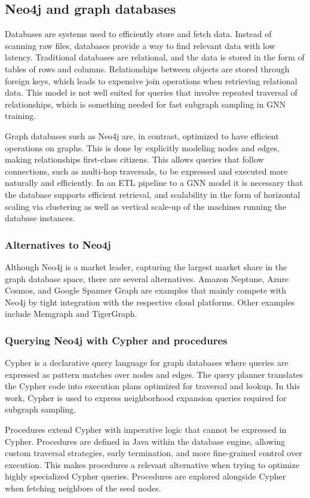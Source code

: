 \documentclass[PhD]{uclathes}
\begin{document}
\subsection{Neo4j and graph databases}
Databases are systems used to efficiently store and fetch data. Instead of
scanning raw files, databases provide a way to find relevant data with low
latency. Traditional databases are relational, and the data is stored in the
form of tables of rows and columns. Relationships between objects are stored
through foreign keys, which leads to expensive join operations when retrieving
relational data. This model is not well suited for queries that involve
repeated traversal of relationships, which is something needed for fast
subgraph sampling in GNN training.

Graph databases such as Neo4j are, in contrast, optimized to have efficient
operations on graphs. This is done by explicitly modeling nodes and edges,
making relationships first-class citizens. This allows queries that follow
connections, such as multi-hop traversals, to be expressed and executed more
naturally and efficiently. In an ETL pipeline to a GNN model it is necessary
that the database supports efficient retrieval, and scalability in the form of
horizontal scaling via clustering as well as vertical scale-up of the machines
running the database instances.

\subsubsection{Alternatives to Neo4j}
Although Neo4j is a market leader, capturing the largest market share in the
graph database space, there are several alternatives. Amazon Neptune, Azure
Cosmos, and Google Spanner Graph are examples that mainly compete with Neo4j by
tight integration with the respective cloud platforms. Other examples include
Memgraph and TigerGraph.

\subsubsection{Querying Neo4j with Cypher and procedures}
Cypher is a declarative query language for graph databases where queries are
expressed as pattern matches over nodes and edges. The query planner translates
the Cypher code into execution plans optimized for traversal and lookup. In
this work, Cypher is used to express neighborhood expansion queries required
for subgraph sampling.

Procedures extend Cypher with imperative logic that cannot be expressed in
Cypher. Procedures are defined in Java within the database engine, allowing
custom traversal strategies, early termination, and more fine-grained control
over execution. This makes procedures a relevant alternative when trying to
optimize highly specialized Cypher queries. Procedures are explored alongside
Cypher when fetching neighbors of the seed nodes.
\end{document}
